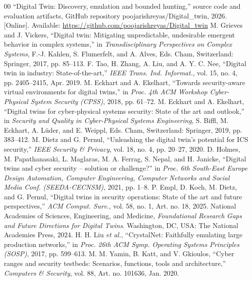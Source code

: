 \documentclass[conference]{IEEEtran}
\begin{document}
\begin{thebibliography}{00}
 ``Digital Twin: Discovery, emulation and bounded hunting,'' source code and evaluation artifacts, GitHub repository poojarishreyas/Digital\_twin, 2026. [Online]. Available: \url{https://github.com/poojarishreyas/Digital_twin}
 M. Grieves and J. Vickers, ``Digital twin: Mitigating unpredictable, undesirable emergent behavior in complex systems,'' in \emph{Transdisciplinary Perspectives on Complex Systems}, F.-J. Kahlen, S. Flumerfelt, and A. Alves, Eds. Cham, Switzerland: Springer, 2017, pp. 85--113.
 F. Tao, H. Zhang, A. Liu, and A. Y. C. Nee, ``Digital twin in industry: State-of-the-art,'' \emph{IEEE Trans. Ind. Informat.}, vol. 15, no. 4, pp. 2405--2415, Apr. 2019.
 M. Eckhart and A. Ekelhart, ``Towards security-aware virtual environments for digital twins,'' in \emph{Proc. 4th ACM Workshop Cyber-Physical System Security (CPSS)}, 2018, pp. 61--72.
 M. Eckhart and A. Ekelhart, ``Digital twins for cyber-physical systems security: State of the art and outlook,'' in \emph{Security and Quality in Cyber-Physical Systems Engineering}, S. Biffl, M. Eckhart, A. L\"{u}der, and E. Weippl, Eds. Cham, Switzerland: Springer, 2019, pp. 383--412.
 M. Dietz and G. Pernul, ``Unleashing the digital twin's potential for ICS security,'' \emph{IEEE Security \& Privacy}, vol. 18, no. 4, pp. 20--27, 2020.
 D. Holmes, M. Papathanasaki, L. Maglaras, M. A. Ferrag, S. Nepal, and H. Janicke, ``Digital twins and cyber security -- solution or challenge?'' in \emph{Proc. 6th South-East Europe Design Automation, Computer Engineering, Computer Networks and Social Media Conf. (SEEDA-CECNSM)}, 2021, pp. 1--8.
 P. Empl, D. Koch, M. Dietz, and G. Pernul, ``Digital twins in security operations: State of the art and future perspectives,'' \emph{ACM Comput. Surv.}, vol. 58, no. 1, Art. no. 18, 2025.
 National Academies of Sciences, Engineering, and Medicine, \emph{Foundational Research Gaps and Future Directions for Digital Twins}. Washington, DC, USA: The National Academies Press, 2024.
 H. H. Liu \emph{et al.}, ``CrystalNet: Faithfully emulating large production networks,'' in \emph{Proc. 26th ACM Symp. Operating Systems Principles (SOSP)}, 2017, pp. 599--613.
 M. M. Yamin, B. Katt, and V. Gkioulos, ``Cyber ranges and security testbeds: Scenarios, functions, tools and architecture,'' \emph{Computers \& Security}, vol. 88, Art. no. 101636, Jan. 2020.

\end{thebibliography}
\end{document}
